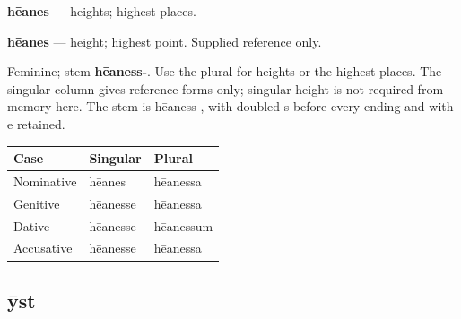 \par\begin{minipage}{\linewidth}\raggedright
\textbf{hēanes} — heights; highest places.

\textbf{hēanes} — height; highest point. Supplied reference only.

Feminine; stem \textbf{hēaness-}. Use the plural for heights or the highest places. The singular column gives reference forms only; singular height is not required from memory here. The stem is hēaness-, with doubled s before every ending and with e retained.

\par\begingroup
\fontsize{10.5}{13.2}\selectfont
\setlength{\LTleft}{0pt}\setlength{\LTright}{\fill}
\noindent
\begin{tabular}{@{}>{\raggedright\arraybackslash}p{39.46mm}>{\raggedright\arraybackslash}p{39.46mm}>{\raggedright\arraybackslash}p{39.46mm}@{}}
\toprule
\textbf{Case} & \textbf{Singular} & \textbf{Plural} \\
\midrule
Nominative & hēanes & hēanessa \\
Genitive & hēanesse & hēanessa \\
Dative & hēanesse & hēanessum \\
Accusative & hēanesse & hēanessa \\
\bottomrule
\end{tabular}
\par\endgroup

\end{minipage}\par
{}
\subsection*{ȳst}

